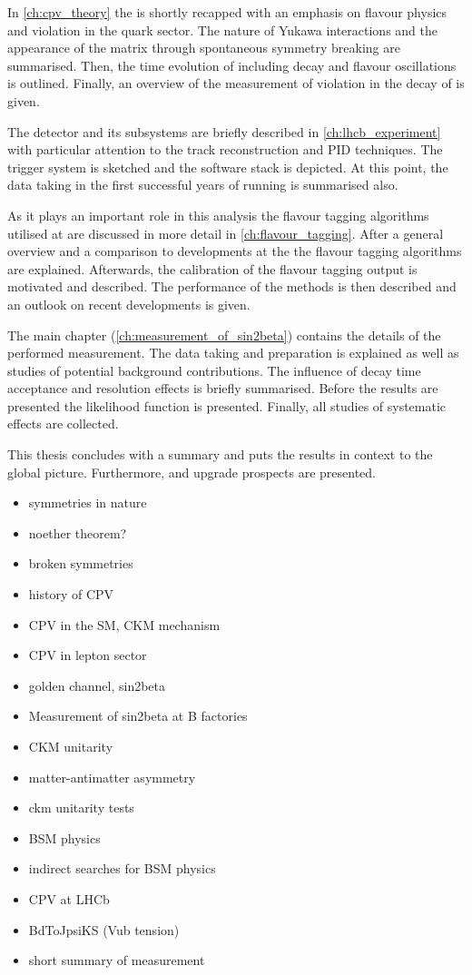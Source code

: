 In \cref{ch:cpv_theory} the \SM is shortly recapped with an emphasis on flavour
physics and \CP violation in the quark sector. The nature of Yukawa
interactions and the appearance of the \CKM matrix through spontaneous symmetry
breaking are summarised. Then, the time evolution of \Bmesons including decay
and flavour oscillations is outlined. Finally, an overview of the measurement of
\CP violation in the decay of \BdToJpsiKS is given.

The \LHCb detector and its subsystems are briefly described in
\cref{ch:lhcb_experiment} with particular attention to the track reconstruction
and \acl{PID} techniques. The \LHCb trigger system is sketched and the software
stack is depicted. At this point, the data taking in the first successful years
of running is summarised also.

As it plays an important role in this analysis the flavour tagging algorithms
utilised at \LHCb are discussed in more detail in \cref{ch:flavour_tagging}.
After a general overview and a comparison to developments at the \BFactories the
flavour tagging algorithms are explained. Afterwards, the calibration of the
flavour tagging output is motivated and described. The performance of the
methods is then described and an outlook on recent developments is given.

The main chapter (\cref{ch:measurement_of_sin2beta}) contains the details of the
performed measurement. The data taking and preparation is explained as well as
studies of potential background contributions. The influence of decay time
acceptance and resolution effects is briefly summarised. Before the results are
presented the likelihood function is presented. Finally, all studies of
systematic effects are collected.

This thesis concludes with a summary and puts the results in context to the
global \CKM picture. Furthermore, \RunTwo and \LHCb upgrade prospects are
presented.

\begin{itemize}
  \item symmetries in nature
  \item noether theorem?
  \item broken symmetries
  \item history of CPV
  \item CPV in the SM, CKM mechanism
  \item CPV in lepton sector
  \item golden channel, sin2beta
  \item Measurement of sin2beta at B factories
  \item CKM unitarity
  \item matter-antimatter asymmetry
  \item ckm unitarity tests
  \item BSM physics
  \item indirect searches for BSM physics
  \item CPV at LHCb
  \item BdToJpsiKS (Vub tension)
  \item short summary of measurement
\end{itemize}
